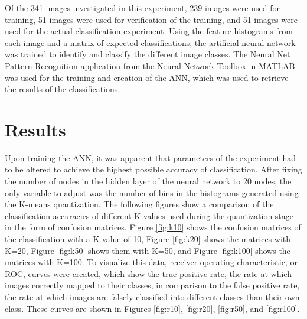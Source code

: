 \documentclass{article}
\begin{document}
Of the 341 images investigated in this experiment, 239 images were used for training, 51 images were used for verification of the training, and 51 images were used for the actual classification experiment. Using the feature histograms from each image and a matrix of expected classifications, the artificial neural network was trained to identify and classify the different image classes. The Neural Net Pattern Recognition application from the Neural Network Toolbox in MATLAB was used for the training and creation of the ANN, which was used to retrieve the results of the classifications.

%
\section{Results}
\label{sec:results}
Upon training the ANN, it was apparent that parameters of the experiment had to be altered to achieve the highest possible accuracy of classification. After fixing the number of nodes in the hidden layer of the neural network to 20 nodes, the only variable to adjust was the number of bins in the histograms generated using the K-means quantization. The following figures show a comparison of the classification accuracies of different K-values used during the quantization stage in the form of confusion matrices. Figure \ref{fig:k10} shows the confusion matrices of the classification with a K-value of 10, Figure \ref{fig:k20} shows the matrices with K=20, Figure \ref{fig:k50} shows them with K=50, and Figure \ref{fig:k100} shows the matrices with K=100. To visualize this data, receiver operating characteristic, or ROC, curves were created, which show the true positive rate, the rate at which images correctly mapped to their classes, in comparison to the false positive rate, the rate at which images are falsely classified into different classes than their own class. These curves are shown in Figures \ref{fig:r10}, \ref{fig:r20}, \ref{fig:r50}, and \ref{fig:r100}.
%
\end{document}
